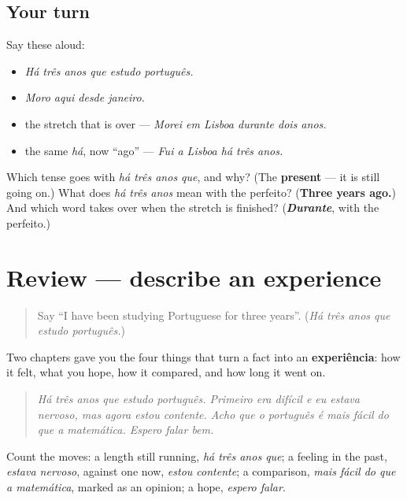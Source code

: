 \subsection*{Your turn}
Say these aloud:

\begin{itemize}
\raggedright
  \item \emph{Há três anos que estudo português.}
  \item \emph{Moro aqui desde janeiro.}
  \item the stretch that is over — \emph{Morei em Lisboa durante dois anos.}
  \item the same \emph{há}, now \textquotedblleft{}ago\textquotedblright{} — \emph{Fui a Lisboa há três anos.}
\end{itemize}

\begin{tcolorbox}[breakable,colback=teal!4,colframe=teal!35!black,title={Before you move on}]
Which tense goes with \emph{há três anos que}, and why? (The \textbf{present} — it is still going on.) What does \emph{há três anos} mean with the perfeito? (\textbf{Three years ago.}) And which word takes over when the stretch is finished? (\emph{\textbf{Durante}}, with the perfeito.)
\end{tcolorbox}
\section[(review)]{Review — describe an experience}

\label{lesson:PT-C266-revisao-experiencia}



\begin{quote}
Say \textquotedblleft{}I have been studying Portuguese for three years\textquotedblright{}. (\emph{Há três anos que estudo português.})
\end{quote}

\begin{grammarlens}[title={What you've built}]
Two chapters gave you the four things that turn a fact into an \textbf{experiência}: how it felt, what you hope, how it compared, and how long it went on.

\begin{quote}
\emph{Há três anos que estudo português. Primeiro era difícil e eu estava nervoso, mas agora estou contente. Acho que o português é mais fácil do que a matemática. Espero falar bem.}
\end{quote}

Count the moves: a length still running, \emph{há três anos que}; a feeling in the past, \emph{estava nervoso}, against one now, \emph{estou contente}; a comparison, \emph{mais fácil do que a matemática}, marked as an opinion; a hope, \emph{espero falar}.
\end{grammarlens}

